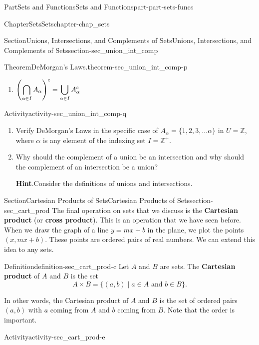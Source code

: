 \documentclass[oneside,10pt,]{book}
\newcommand{\blocktitlefont}{\relax}
\newcommand{\terminology}[1]{\textbf{#1}}
\numberwithin{equation}{chapter}
\newcommand{\Z}{\mathbb{Z}}
\begin{document}
\begin{partptx}{Part}{Sets and Functions}{}{Sets and Functions}{}{}{part-part-sets-funcs}
\begin{chapterptx}{Chapter}{Sets}{}{Sets}{}{}{chapter-chap_sets}
\begin{sectionptx}{Section}{Unions, Intersections, and Complements of Sets}{}{Unions, Intersections, and Complements of Sets}{}{}{section-sec_union_int_comp}
\begin{theorem}{Theorem}{DeMorgan's Laws.}{}{theorem-sec_union_int_comp-p}
\begin{enumerate}
\item{}\(\displaystyle \displaystyle \left(\bigcap_{\alpha \in I} A_{\alpha}\right)^c = \bigcup_{\alpha \in I} A_{\alpha}^c\)%
\end{enumerate}
%
\end{theorem}
\begin{activity}{Activity}{}{activity-sec_union_int_comp-q}%
\begin{enumerate}[font=\bfseries,label=(\alph*),ref=\alph*]%
\item{}Verify DeMorgan's Laws in the specific case of \(A_{\alpha} = \{1, 2, 3, \ldots \alpha\}\) in \(U = \Z\), where \(\alpha\) is any element of the indexing set \(I = \Z^+\).%
\item{}Why should the complement of a union be an intersection and why should the complement of an intersection be a union?%
\par\smallskip%
\noindent\textbf{\blocktitlefont Hint}.\hypertarget{hint-sec_union_int_comp-q-b-b}{}\quad{}Consider the definitions of unions and intersections.%
\end{enumerate}%
\end{activity}%
\end{sectionptx}
%
%
\typeout{************************************************}
\typeout{************************************************}
%
\begin{sectionptx}{Section}{Cartesian Products of Sets}{}{Cartesian Products of Sets}{}{}{section-sec_cart_prod}
The final operation on sets that we discuss is the \terminology{Cartesian product} (or \terminology{cross product}). This is an operation that we have seen before. When we draw the graph of a line \(y = mx+b\) in the plane, we plot the points \((x,mx+b)\). These points are ordered pairs of real numbers. We can extend this idea to any sets.%
\begin{definition}{Definition}{}{definition-sec_cart_prod-c}%
%
Let \(A\) and \(B\) are sets. The \terminology{Cartesian product} of \(A\) and \(B\) is the set%
\begin{equation*}
A \times B = \{(a,b) \mid a \in A \text{ and }  b \in B\}\text{.}
\end{equation*}
%
\end{definition}
In other words, the Cartesian product of \(A\) and \(B\) is the set of ordered pairs \((a,b)\) with \(a\) coming from \(A\) and \(b\) coming from \(B\). Note that the order is important.%
\begin{activity}{Activity}{}{activity-sec_cart_prod-e}%

\end{activity}
\end{sectionptx}
\end{chapterptx}
\end{partptx}
\end{document}
